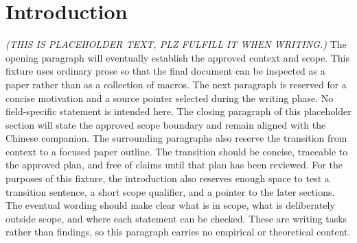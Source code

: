 \section{Introduction}\label{sec:introduction}
\textit{(THIS IS PLACEHOLDER TEXT, PLZ FULFILL IT WHEN WRITING.)}
The opening paragraph will eventually establish the approved context and scope. This fixture uses ordinary prose so that the final document can be inspected as a paper rather than as a collection of macros.
The next paragraph is reserved for a concise motivation and a source pointer selected during the writing phase. No field-specific statement is intended here.
The closing paragraph of this placeholder section will state the approved scope boundary and remain aligned with the Chinese companion.
The surrounding paragraphs also reserve the transition from context to a focused paper outline. The transition should be concise, traceable to the approved plan, and free of claims until that plan has been reviewed.
For the purposes of this fixture, the introduction also reserves enough space to test a transition sentence, a short scope qualifier, and a pointer to the later sections. The eventual wording should make clear what is in scope, what is deliberately outside scope, and where each statement can be checked. These are writing tasks rather than findings, so this paragraph carries no empirical or theoretical content.

